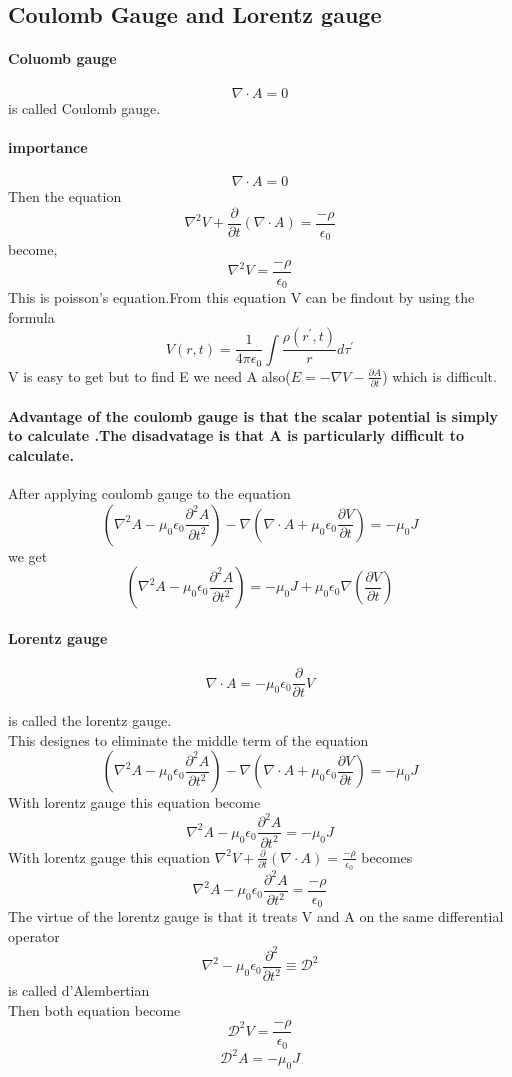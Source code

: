 \subsection{Coulomb Gauge and Lorentz gauge}
\paragraph{Coluomb gauge}
$$\nabla \cdot A=0$$ is called Coulomb gauge.\\
\paragraph{importance}
$$\nabla \cdot A=0$$ Then the equation 
$$\nabla ^2V+\frac{\partial }{\partial t}(\nabla \cdot A)=\frac{-\rho}{\epsilon_{0}}$$ become,\\
$$\nabla^2 V=\frac{-\rho}{\epsilon_{0}}$$
This is poisson's equation.From this equation V can be findout by using the formula\\
$$V(r,t)=\frac{1}{4 \pi \epsilon_0}\int \frac{\rho(r^{\prime},t)}{r}d\tau^{\prime}$$
V is easy to get but to find E we need  A also($E=-\nabla V-\frac{\partial A}{\partial t}$) which is difficult.
\paragraph{Advantage of the coulomb gauge is that the scalar potential is simply to calculate .The disadvatage is that  A is particularly difficult to calculate. }
After applying coulomb gauge to the equation 
$$\left( \nabla^2A-\mu_{0}\epsilon_{0}\frac{\partial^2 A}{\partial t^2}\right) -\nabla\left( \nabla \cdot A+\mu_{0}\epsilon_{0}\frac{\partial V}{\partial t}\right) =-\mu_{0} J$$ 
we get\\
$$\left( \nabla^2A-\mu_{0}\epsilon_{0}\frac{\partial^2 A}{\partial t^2}\right)=-\mu_{0}J+\mu_{0} \epsilon_{0}\nabla \left( \frac{\partial V}{\partial t}\right) $$
\paragraph{Lorentz gauge}
$$\nabla \cdot A =-\mu_{0} \epsilon_{0} \frac{\partial}{\partial t}V$$

 is called the lorentz gauge.\\
 This designes to eliminate the middle term of the equation
$$\left( \nabla^2A-\mu_{0}\epsilon_{0}\frac{\partial^2 A}{\partial t^2}\right) -\nabla\left( \nabla \cdot A+\mu_{0}\epsilon_{0}\frac{\partial V}{\partial t}\right) =-\mu_{0} J$$
With lorentz gauge this equation become
$$\nabla^2A-\mu_{0}\epsilon_{0}\frac{\partial^2 A}{\partial t^2}=-\mu_{0} J$$
With lorentz gauge this equation 
$\nabla ^2V+\frac{\partial }{\partial t}(\nabla \cdot A)=\frac{-\rho}{\epsilon_{0}}$
becomes
$$\nabla^2A-\mu_{0}\epsilon_{0}\frac{\partial^2 A}{\partial t^2}=\frac{-\rho}{\epsilon_{0}}$$
The virtue of the lorentz gauge is that it treats V and A on the same differential operator
$$\nabla^2-\mu_{0} \epsilon_{0}\frac{\partial ^2}{\partial t^2}\equiv \mathcal{D}^2  $$
 is called d'Alembertian\\
Then both equation become\\
$$\mathcal{D}^2V=\frac{-\rho}{\epsilon_{0}}$$
$$\mathcal{D}^2A=-\mu_{0} J$$


